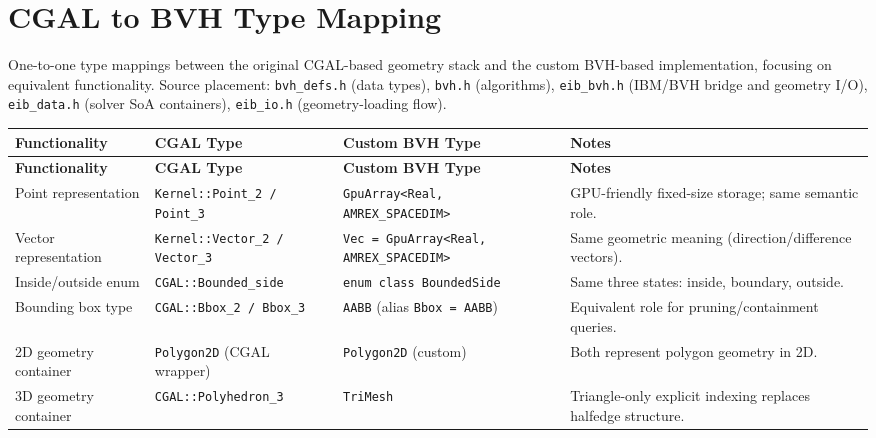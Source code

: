 \documentclass[11pt,a4paper]{article}
\begin{document}
\section{CGAL to BVH Type Mapping}

One-to-one type mappings between the original CGAL-based geometry stack and the custom
BVH-based implementation, focusing on equivalent functionality.
Source placement: \texttt{bvh\_defs.h} (data types), \texttt{bvh.h} (algorithms),
\texttt{eib\_bvh.h} (IBM/BVH bridge and geometry I/O), \texttt{eib\_data.h}
(solver SoA containers), \texttt{eib\_io.h} (geometry-loading flow).

\renewcommand{\arraystretch}{1.3}
\begin{longtable}{p{} p{} p{} p{}}
\toprule
\textbf{Functionality} & \textbf{CGAL Type} & \textbf{Custom BVH Type} & \textbf{Notes} \\
\midrule
\endfirsthead
\toprule
\textbf{Functionality} & \textbf{CGAL Type} & \textbf{Custom BVH Type} & \textbf{Notes} \\
\midrule
\endhead

Point representation
  & \texttt{Kernel::Point\_2 / Point\_3}
  & \texttt{GpuArray<Real, AMREX\_SPACEDIM>}
  & GPU-friendly fixed-size storage; same semantic role. \\ \midrule

Vector representation
  & \texttt{Kernel::Vector\_2 / Vector\_3}
  & \texttt{Vec = GpuArray<Real, AMREX\_SPACEDIM>}
  & Same geometric meaning (direction/difference vectors). \\ \midrule

Inside/outside enum
  & \texttt{CGAL::Bounded\_side}
  & \texttt{enum class BoundedSide}
  & Same three states: inside, boundary, outside. \\ \midrule

Bounding box type
  & \texttt{CGAL::Bbox\_2 / Bbox\_3}
  & \texttt{AABB} (alias \texttt{Bbox = AABB})
  & Equivalent role for pruning/containment queries. \\ \midrule

2D geometry container
  & \texttt{Polygon2D} (CGAL wrapper)
  & \texttt{Polygon2D} (custom)
  & Both represent polygon geometry in 2D. \\ \midrule

3D geometry container
  & \texttt{CGAL::Polyhedron\_3}
  & \texttt{TriMesh}
  & Triangle-only explicit indexing replaces halfedge structure. \\ \midrule


\end{longtable}
\end{document}
